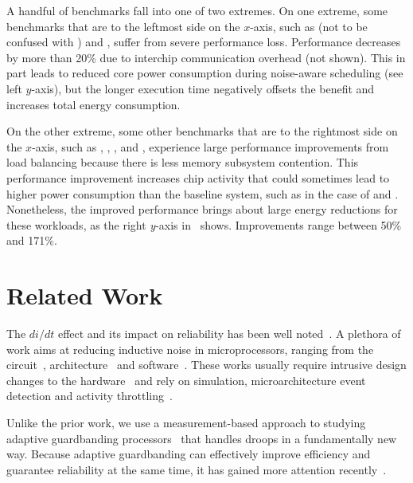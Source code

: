 A handful of benchmarks fall into one of two extremes. On one extreme, some benchmarks that are to the leftmost side on the $x$-axis, such as  (not to be confused with ) and , suffer from severe performance loss. Performance decreases by more than 20\% due to interchip communication overhead (not shown). This in part leads to reduced core power consumption during noise-aware scheduling (see left $y$-axis), but the longer execution time negatively offsets the benefit and increases total energy consumption. 

On the other extreme, some other benchmarks that are to the rightmost side on the $x$-axis, such as , , ,  and , experience large performance improvements from load balancing because there is less memory subsystem contention. This performance improvement increases chip activity that could sometimes lead to higher power consumption than the baseline system, such as in the case of  and . Nonetheless, the improved performance brings about large energy reductions for these workloads, as the right \textit{y}-axis in~ shows. Improvements range between 50\% and 171\%.

\section{Related Work}
\label{sec:voltage:related}

The $di/dt$ effect and its impact on reliability has been well noted~\cite{james2007comparison,reddi2010voltage,kim2012audit,bertran2014voltage}. A plethora of work aims at reducing inductive noise in microprocessors, ranging from the circuit~\cite{ernst2003razor,blaauw2008razorii}, architecture~\cite{grochowski2002microarchitectural,powell2003pipeline,gupta2007understanding,gupta2008decor,gupta2009event,reddi2009voltage,reddi2010voltage,miller2012vrsync,zhang2014architecture} and software~\cite{reddi2010eliminating}. These works usually require intrusive design changes to the hardware~\cite{ernst2003razor,blaauw2008razorii,gupta2008decor,reddi2009voltage} and rely on simulation, microarchitecture event detection and activity throttling~\cite{grochowski2002microarchitectural,powell2003pipeline,gupta2009event,reddi2009voltage,reddi2010eliminating,miller2012vrsync}.

Unlike the prior work, we use a measurement-based approach to studying adaptive guardbanding processors~\cite{fischer200590nm,tschanz2007adaptive,kurd2008next,lefurgy2011active,bowman201222nm} that handles droops in a fundamentally new way. Because adaptive guardbanding can effectively improve efficiency and guarantee reliability at the same time, it has gained more attention recently~\cite{grenat20145,tokunaga20145,bowman20158}.

